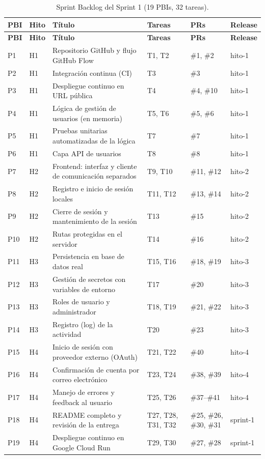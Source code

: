 {\small
\begin{longtable}{@{}L{0.7cm} L{0.8cm} L{5.6cm} L{1.9cm} L{2.4cm} L{1.6cm}@{}}
\caption{Sprint Backlog del Sprint 1 (19 PBIs, 32 tareas).}\label{tab:sprint1-backlog}\\
\toprule
\textbf{PBI} & \textbf{Hito} & \textbf{Título} & \textbf{Tareas} & \textbf{PRs} & \textbf{Release} \\ \midrule \endfirsthead
\toprule
\textbf{PBI} & \textbf{Hito} & \textbf{Título} & \textbf{Tareas} & \textbf{PRs} & \textbf{Release} \\ \midrule \endhead
P1 & H1 & Repositorio GitHub y flujo GitHub Flow & T1, T2 & \#1, \#2 & hito-1 \\
P2 & H1 & Integración continua (CI) & T3 & \#3 & hito-1 \\
P3 & H1 & Despliegue continuo en URL pública & T4 & \#4, \#10 & hito-1 \\
P4 & H1 & Lógica de gestión de usuarios (en memoria) & T5, T6 & \#5, \#6 & hito-1 \\
P5 & H1 & Pruebas unitarias automatizadas de la lógica & T7 & \#7 & hito-1 \\
P6 & H1 & Capa API de usuarios & T8 & \#8 & hito-1 \\
P7 & H2 & Frontend: interfaz y cliente de comunicación separados & T9, T10 & \#11, \#12 & hito-2 \\
P8 & H2 & Registro e inicio de sesión locales & T11, T12 & \#13, \#14 & hito-2 \\
P9 & H2 & Cierre de sesión y mantenimiento de la sesión & T13 & \#15 & hito-2 \\
P10 & H2 & Rutas protegidas en el servidor & T14 & \#16 & hito-2 \\
P11 & H3 & Persistencia en base de datos real & T15, T16 & \#18, \#19 & hito-3 \\
P12 & H3 & Gestión de secretos con variables de entorno & T17 & \#20 & hito-3 \\
P13 & H3 & Roles de usuario y administrador & T18, T19 & \#21, \#22 & hito-3 \\
P14 & H3 & Registro (log) de la actividad & T20 & \#23 & hito-3 \\
P15 & H4 & Inicio de sesión con proveedor externo (OAuth) & T21, T22 & \#40 & hito-4 \\
P16 & H4 & Confirmación de cuenta por correo electrónico & T23, T24 & \#38, \#39 & hito-4 \\
P17 & H4 & Manejo de errores y feedback al usuario & T25, T26 & \#37--\#41 & hito-4 \\
P18 & H4 & README completo y revisión de la entrega & T27, T28, T31, T32 & \#25, \#26, \#30, \#31 & sprint-1 \\*
P19 & H4 & Despliegue continuo en Google Cloud Run & T29, T30 & \#27, \#28 & sprint-1 \\*
\bottomrule
\end{longtable}
}

